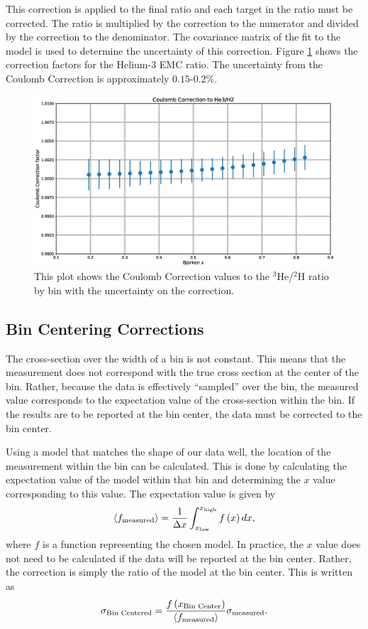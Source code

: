 This correction is applied to the final ratio and each target in the ratio must be corrected. The ratio is multiplied by the correction to the numerator and divided by the correction to the denominator. The covariance matrix of the fit to the model is used to determine the uncertainty of this correction. Figure \ref{fig:CC} shows the correction factors for the Helium-3 EMC ratio. The uncertainty from the Coulomb Correction is approximately $0.15$-$0.2\%$.

\begin{figure}
	\includegraphics[width=\textwidth]{./analysis/fig/cc.eps}
	\caption{This plot shows the Coulomb Correction values to the $^3$He/$^2$H ratio by bin with the uncertainty on the correction.}
	\label{fig:CC}
\end{figure}

\subsection{Bin Centering Corrections}

The cross-section over the width of a bin is not constant. This means that the measurement does not correspond with the true cross section at the center of the bin. Rather, because the data is effectively ``sampled'' over the bin, the measured value corresponds to the expectation value of the cross-section within the bin. If the results are to be reported at the bin center, the data must be corrected to the bin center.

Using a model that matches the shape of our data well, the location of the measurement within the bin can be calculated. This is done by calculating the expectation value of the model within that bin and determining the $x$ value corresponding to this value. The expectation value is given by
\begin{equation}
	\langle f_{\rm measured}\rangle = \frac{1}{\Delta x}\int_{x_{\rm low}}^{x_{\rm high}} f\left( x \right) dx,
\end{equation}
where $f$ is a function representing the chosen model. In practice, the $x$ value does not need to be calculated if the data will be reported at the bin center. Rather, the correction is simply the ratio of the model at the bin center. This is written as
\begin{equation}
	\sigma_{\textrm{Bin Centered}} = \frac{f\left(x_{\textrm{Bin Center}}\right)}{\langle f_{\rm measured}\rangle} \sigma_{\rm measured}.
\end{equation}

